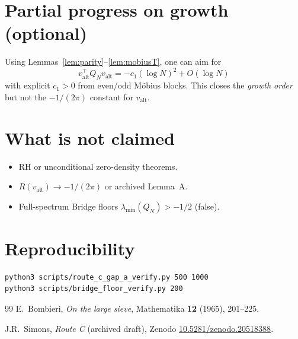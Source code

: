 \documentclass[11pt]{article}
\begin{document}
\section{Partial progress on growth (optional)}

Using Lemmas~\ref{lem:parity}--\ref{lem:mobiusT}, one can aim for
\[
v_{\mathrm{alt}}^\top Q_N v_{\mathrm{alt}}=-c_1(\log N)^2+O(\log N)
\]
with explicit $c_1>0$ from even/odd M\"obius blocks.
This closes the \emph{growth order} but not the $-1/(2\pi)$ constant for
$v_{\mathrm{alt}}$.

\section{What is not claimed}

\begin{itemize}[leftmargin=1.2em]
\item RH or unconditional zero-density theorems.
\item $R(v_{\mathrm{alt}})\to -1/(2\pi)$ or archived Lemma~A.
\item Full-spectrum Bridge floors $\lambda_{\min}(Q_N)>-1/2$ (false).
\end{itemize}

\section*{Reproducibility}
\begin{verbatim}
python3 scripts/route_c_gap_a_verify.py 500 1000
python3 scripts/bridge_floor_verify.py 200
\end{verbatim}

\begin{thebibliography}{99}
E.~Bombieri,
\textit{On the large sieve},
Mathematika \textbf{12} (1965), 201--225.

J.R.~Simons,
\textit{Route C} (archived draft),
Zenodo \href{https://doi.org/10.5281/zenodo.20518388}{10.5281/zenodo.20518388}.
\end{thebibliography}
\end{document}
